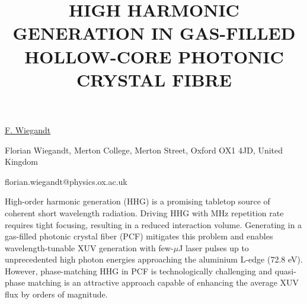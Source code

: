 \title{HIGH HARMONIC GENERATION IN GAS-FILLED HOLLOW-CORE PHOTONIC CRYSTAL FIBRE}

\underline{F. Wiegandt}  

{\normalsize{\vspace{-4mm}
Florian Wiegandt,
Merton College,
Merton Street,
Oxford OX1 4JD,
United Kingdom



\email florian.wiegandt@physics.ox.ac.uk}}

High-order harmonic generation (HHG) is a promising tabletop source of coherent short wavelength radiation. Driving HHG with MHz repetition rate requires tight focusing, resulting in a reduced interaction volume. Generating in a gas-filled photonic crystal fiber (PCF) mitigates this problem and enables wavelength-tunable XUV generation with few-$\mu$J laser pulses up to unprecedented high photon energies approaching the aluminium L-edge (72.8 eV). However, phase-matching HHG in PCF is technologically challenging and quasi-phase matching is an attractive approach capable of enhancing the average XUV flux by orders of magnitude.

\vspace{\baselineskip}

